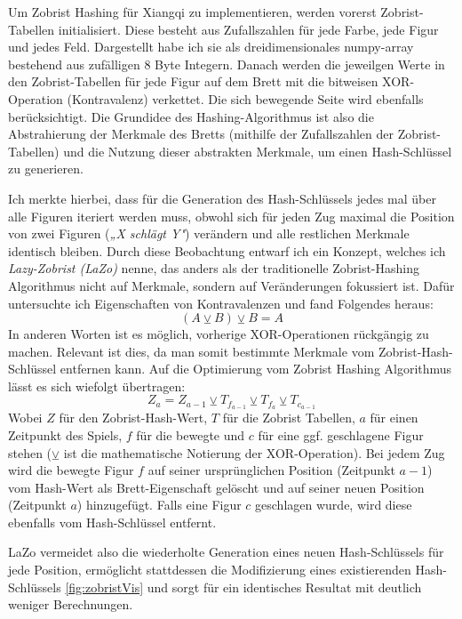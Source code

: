 \documentclass{jpp}
\begin{document}
Um Zobrist Hashing für Xiangqi zu implementieren, werden vorerst Zobrist-Tabellen initialisiert. Diese besteht aus Zufallszahlen für jede Farbe, jede Figur und jedes Feld. Dargestellt habe ich sie als dreidimensionales numpy-array bestehend aus zufälligen 8 Byte Integern. 
Danach werden die jeweilgen Werte in den Zobrist-Tabellen für jede Figur auf dem Brett mit die bitweisen XOR-Operation (Kontravalenz) verkettet. Die sich bewegende Seite wird ebenfalls berücksichtigt.
Die Grundidee des Hashing-Algorithmus ist also die Abstrahierung der Merkmale des Bretts (mithilfe der Zufallszahlen der Zobrist-Tabellen) und die Nutzung dieser abstrakten Merkmale, um einen Hash-Schlüssel zu generieren.

Ich merkte hierbei, dass für die Generation des Hash-Schlüssels jedes mal über alle Figuren iteriert werden muss, obwohl sich für jeden Zug maximal die Position von zwei Figuren (\textit{„X schlägt Y"}) verändern und alle restlichen Merkmale identisch bleiben. Durch diese Beobachtung entwarf ich ein Konzept, welches ich \textit{Lazy-Zobrist (LaZo)} nenne, das anders als der traditionelle Zobrist-Hashing Algorithmus nicht auf Merkmale, sondern auf Veränderungen fokussiert ist. 
Dafür untersuchte ich Eigenschaften von Kontravalenzen und fand Folgendes heraus:
\begin{equation}
    (A\veebar B) \veebar B = A
\end{equation}
In anderen Worten ist es möglich, vorherige XOR-Operationen rückgängig zu machen. Relevant ist dies, da man somit bestimmte Merkmale vom Zobrist-Hash-Schlüssel entfernen kann. Auf die Optimierung vom Zobrist Hashing Algorithmus lässt es sich wiefolgt übertragen:
\begin{equation}
    Z_a = Z_{a-1} \veebar T_{f_{a-1}} \veebar T_{f_a} \veebar T_{c_{a-1}}
\end{equation}
Wobei $Z$  für den Zobrist-Hash-Wert, $T$ für die Zobrist Tabellen, $a$ für einen Zeitpunkt des Spiels, $f$ für die bewegte und $c$ für eine ggf. geschlagene Figur stehen ($\veebar$ ist die mathematische Notierung der XOR-Operation). Bei jedem Zug wird die bewegte Figur $f$ auf seiner ursprünglichen Position (Zeitpunkt $a-1$) vom Hash-Wert als Brett-Eigenschaft gelöscht und auf seiner neuen Position (Zeitpunkt $a$) hinzugefügt. Falls eine Figur $c$ geschlagen wurde, wird diese ebenfalls vom Hash-Schlüssel entfernt.

LaZo vermeidet also die wiederholte Generation eines neuen Hash-Schlüssels für jede Position, ermöglicht stattdessen die Modifizierung eines existierenden Hash-Schlüssels \ref{fig:zobristVis}  und sorgt für ein identisches Resultat mit deutlich weniger Berechnungen.
\end{document}
